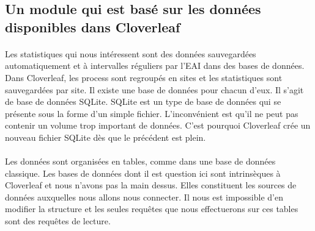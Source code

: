		\subsection{Un module qui est basé sur les données disponibles dans
		Cloverleaf}
			\paragraph{}
			Les statistiques qui nous intéressent sont des données sauvegardées
			automatiquement et à intervalles réguliers par l'EAI
			dans des bases de données. Dans Cloverleaf, les process sont regroupés en
			sites et les statistiques sont sauvegardées par site. Il existe une base de
			données pour chacun d'eux. Il s'agit de base de données SQLite. SQLite est un
			type de base de données qui se présente sous la forme d'un simple fichier.
			L'inconvénient est qu'il ne peut pas contenir un volume trop important de
			données. C'est pourquoi Cloverleaf crée un nouveau fichier SQLite dès que le
			précédent est plein.
			
			\paragraph{}
			Les données sont organisées en tables, comme dans une base de données
			classique. Les bases de données dont il est question ici sont intrinsèques
			à Cloverleaf et nous n'avons pas la main dessus. Elles constituent les
			sources de données auxquelles nous allons nous connecter. Il nous est
			impossible d'en modifier la structure et les seules requêtes que nous
			effectuerons sur ces tables sont des requêtes de lecture.
			
